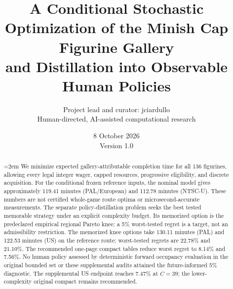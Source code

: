 \documentclass[11pt]{article}
\title{A Conditional Stochastic Optimization of the Minish Cap Figurine Gallery\\and Distillation into Observable Human Policies}
\author{Project lead and curator: jciardullo\\\small Human-directed, AI-assisted computational research}
\date{8 October 2026\\[0.4em]\small Version 1.0}
\theoremstyle{definition}\newtheorem{definition}[theorem]{Definition}
\begin{document}
\maketitle
\begin{abstract}
\emergencystretch=2em
We minimize expected gallery-attributable completion time for all 136 figurines, allowing every legal integer wager, capped resources, progressive eligibility, and discrete acquisition. For the conditional frozen reference inputs, the nominal model gives approximately 119.41 minutes (PAL/European) and 112.78 minutes (NTSC-U). These numbers are not certified whole-game route optima or microsecond-accurate measurements. The separate policy-distillation problem seeks the best tested memorable strategy under an explicit complexity budget. Its memorized option is the predeclared empirical regional Pareto knee; a 5\% worst-tested regret is a target, not an admissibility restriction.
The memorized knee options take 130.11 minutes (PAL) and 122.53 minutes (US) on the reference route; worst-tested regrets are 22.78\% and 21.10\%. The recommended one-page compact tables reduce worst regret to 8.14\% and 7.56\%. No human policy assessed by deterministic forward occupancy evaluation in the original bounded set or these supplemental audits attained the future-informed 5\% diagnostic. The supplemental US endpoint reaches 7.47\% at $C=39$; the lower-complexity original compact remains recommended.
\end{abstract}

\clearpage
\end{document}
